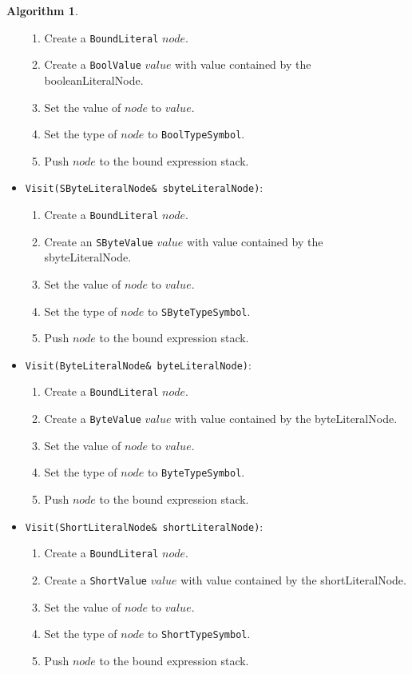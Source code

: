 \documentclass[a4paper,oneside,11pt]{book}
\theoremstyle{definition}
\newtheorem{algo}{Algorithm}[section]
\begin{document}
\begin{algo}
\begin{itemize}
\begin{enumerate}
\item
Create a \verb|BoundLiteral| $node$.
\item
Create a \verb|BoolValue| $value$ with value contained by the booleanLiteralNode.
\item
Set the value of $node$ to $value$.
\item
Set the type of $node$ to \verb|BoolTypeSymbol|.
\item
Push $node$ to the bound expression stack.
\end{enumerate}
\item
\verb|Visit(SByteLiteralNode& sbyteLiteralNode)|:
\begin{enumerate}
\item
Create a \verb|BoundLiteral| $node$.
\item
Create an \verb|SByteValue| $value$ with value contained by the sbyteLiteralNode.
\item
Set the value of $node$ to $value$.
\item
Set the type of $node$ to \verb|SByteTypeSymbol|.
\item
Push $node$ to the bound expression stack.
\end{enumerate}
\item
\verb|Visit(ByteLiteralNode& byteLiteralNode)|:
\begin{enumerate}
\item
Create a \verb|BoundLiteral| $node$.
\item
Create a \verb|ByteValue| $value$ with value contained by the byteLiteralNode.
\item
Set the value of $node$ to $value$.
\item
Set the type of $node$ to \verb|ByteTypeSymbol|.
\item
Push $node$ to the bound expression stack.
\end{enumerate}
\item
\verb|Visit(ShortLiteralNode& shortLiteralNode)|:
\begin{enumerate}
\item
Create a \verb|BoundLiteral| $node$.
\item
Create a \verb|ShortValue| $value$ with value contained by the shortLiteralNode.
\item
Set the value of $node$ to $value$.
\item
Set the type of $node$ to \verb|ShortTypeSymbol|.
\item
Push $node$ to the bound expression stack.
\end{enumerate}

\end{itemize}
\end{algo}
\end{document}
